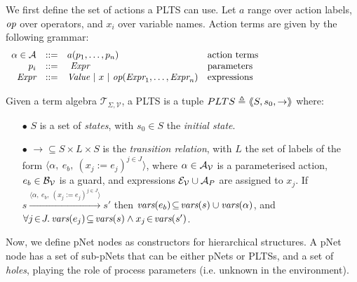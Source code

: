 \documentclass[smallcondensed]{svjour3}
\newcommand{\noteSB}[2][color=green!40, size=\tiny]{\todo[#1]{{\bf
      Note: } {#2}}}
\newcommand{\cT}{\ensuremath{\mathcal{T}}}
\newcommand{\cV}{\ensuremath{\mathcal{V}}}
\newcommand{\signature}{\ensuremath{\Sigma}}
\newcommand{\variables}{\ensuremath{\cV}}
\newcommand{\Talg}{\ensuremath{\cT_{\signature,\variables}}}
\def\AlgE{\mathcal{E}}
\def\AlgA{\mathcal{A}}
\def\AlgB{\mathcal{B}}
\begin{document}
We first define the set of actions a PLTS can use.  Let $a$
range over action labels, $\symb{op}$ over operators, and $x_i$  over
variable names. Action terms are given by the following grammar:
\[
\begin{array}[l]{rcl@{\quad}p{5.5cm}}
\alpha\in\AlgA&::=&a(p_1,\ldots,p_n)&\text{action terms}\\
p_i&::=& ~\symb{Expr}&\text{parameters}\\
\symb{Expr}&::=& \symb{Value}~|~x~|~\symb{op}(\symb{Expr}_1,\dots,\symb{Expr}_n)&\text{expressions}
\end{array}
\]

\begin{definition}[PLTS]
	\label{PLTS}
	Given a term algebra $\Talg$, a PLTS is a tuple
	$PLTS\triangleq\langle\hspace{-0.58ex}\langle S,s_0, \to\rangle\hspace{-0.58ex}\rangle$ where:
	\begin{itemize}
		\item[$\bullet$]
		$S$ is a set of \emph{states}, with $s_0 \in S$ the \emph{initial state}.
		\item[$\bullet$] $\to \subseteq S \times L \times S$ is the \emph{transition relation}, with
		$L$ the set of labels of the form
		$\langle \alpha,~e_b,~(x_j\!:= {e}_j)^{j\in J}\rangle$,
		where $\alpha \in\AlgA_{\P}$ is a parameterised action,
		$e_b \in \AlgB_{\P}$ is a guard, and
		expressions  $\AlgE_{\P}\cup\AlgA_{P}$ are assigned to $x_j$.
		If 
		$s \xrightarrow{\langle \alpha,~e_b,~(x_j\!:= {e}_j)^{j\in
				J}\rangle} s'$ then 
		$\vars(e_b)\!\subseteq\! \vars(s)\cup\vars(\alpha)$, and
		$\forall j\!\in\! J .\,\vars(e_j)\!\subseteq\! \vars(s)\land 
		x_j\!\in\!\vars(s')$.
	\end{itemize}
\end{definition}

Now, we define
pNet nodes as constructors for hierarchical structures.
A pNet node has a set of sub-pNets that can be either pNets or PLTSs, and a
set of \emph{holes}, playing the role of process parameters
(i.e. unknown in the environment).
\end{document}
